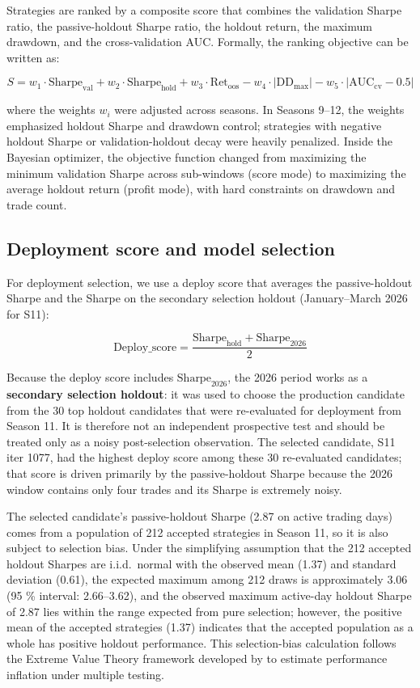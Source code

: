 \documentclass[11pt,a4paper]{article}
\begin{document}
Strategies are ranked by a composite score that combines the validation Sharpe ratio, the passive-holdout Sharpe ratio, the holdout return, the maximum drawdown, and the cross-validation AUC. Formally, the ranking objective can be written as:

\[S = w_1 \cdot \text{Sharpe}_{\text{val}} + w_2 \cdot \text{Sharpe}_{\text{hold}} + w_3 \cdot \text{Ret}_{\text{oos}} - w_4 \cdot |\text{DD}_{\text{max}}| - w_5 \cdot |\text{AUC}_{\text{cv}} - 0.5|\]

where the weights \(w_i\) were adjusted across seasons. In Seasons 9--12, the weights emphasized holdout Sharpe and drawdown control; strategies with negative holdout Sharpe or validation-holdout decay were heavily penalized. Inside the Bayesian optimizer, the objective function changed from maximizing the minimum validation Sharpe across sub-windows (score mode) to maximizing the average holdout return (profit mode), with hard constraints on drawdown and trade count.

\subsection{Deployment score and model selection}\label{deployment-score-and-model-selection}

For deployment selection, we use a deploy score that averages the passive-holdout Sharpe and the Sharpe on the secondary selection holdout (January--March 2026 for S11):

\[\text{Deploy\_score} = \frac{\text{Sharpe}_{\text{hold}} + \text{Sharpe}_{\text{2026}}}{2}\]

Because the deploy score includes \(\text{Sharpe}_{\text{2026}}\), the 2026 period works as a \textbf{secondary selection holdout}: it was used to choose the production candidate from the 30 top holdout candidates that were re-evaluated for deployment from Season 11. It is therefore not an independent prospective test and should be treated only as a noisy post-selection observation. The selected candidate, S11 iter 1077, had the highest deploy score among these 30 re-evaluated candidates; that score is driven primarily by the passive-holdout Sharpe because the 2026 window contains only four trades and its Sharpe is extremely noisy.

The selected candidate's passive-holdout Sharpe (2.87 on active trading days) comes from a population of 212 accepted strategies in Season 11, so it is also subject to selection bias. Under the simplifying assumption that the 212 accepted holdout Sharpes are i.i.d.~normal with the observed mean (1.37) and standard deviation (0.61), the expected maximum among 212 draws is approximately 3.06 (95 \% interval: 2.66--3.62), and the observed maximum active-day holdout Sharpe of 2.87 lies within the range expected from pure selection; however, the positive mean of the accepted strategies (1.37) indicates that the accepted population as a whole has positive holdout performance. This selection-bias calculation follows the Extreme Value Theory framework developed by \citep{bailey_2014} to estimate performance inflation under multiple testing.
\end{document}

